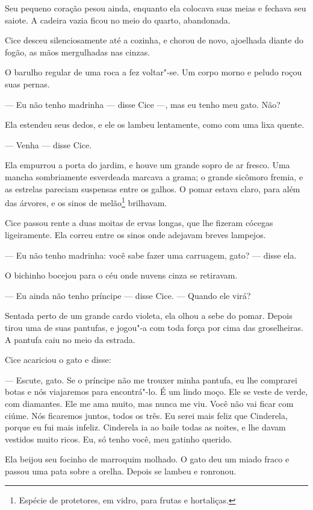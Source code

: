 Seu pequeno coração pesou ainda, enquanto ela colocava suas meias e
fechava seu saiote. A cadeira vazia ficou no meio do quarto, abandonada.

Cice desceu silenciosamente até a cozinha, e chorou de novo, ajoelhada
diante do fogão, as mãos mergulhadas nas cinzas.

O barulho regular de uma roca a fez voltar"-se. Um corpo morno e peludo
roçou suas pernas.

--- Eu não tenho madrinha --- disse Cice ---, mas eu tenho meu gato. Não?

Ela estendeu seus dedos, e ele os lambeu lentamente, como com uma lixa
quente.

--- Venha --- disse Cice.

Ela empurrou a porta do jardim, e houve um grande sopro de ar fresco.
Uma mancha sombriamente esverdeada marcava a grama; o grande sicômoro
fremia, e as estrelas pareciam suspensas entre os galhos. O pomar estava
claro, para além das árvores, e os sinos de melão\footnote{ Espécie de
protetores, em vidro, para frutas e hortaliças.} brilhavam.

Cice passou rente a duas moitas de ervas longas, que lhe fizeram
cócegas ligeiramente. Ela correu entre os sinos onde adejavam breves
lampejos.

--- Eu não tenho madrinha: você sabe fazer uma carruagem, gato? --- disse
ela.

O bichinho bocejou para o céu onde nuvens cinza se retiravam.

--- Eu ainda não tenho príncipe --- disse Cice. --- Quando ele virá?

Sentada perto de um grande cardo violeta, ela olhou a sebe do pomar.
Depois tirou uma de suas pantufas, e jogou"-a com toda força por cima das
groselheiras. A pantufa caiu no meio da estrada.

Cice acariciou o gato e disse:

--- Escute, gato. Se o príncipe não me trouxer minha pantufa, eu lhe
comprarei botas e nós viajaremos para encontrá"-lo. É um lindo moço. Ele se
veste de verde, com diamantes. Ele me ama muito, mas nunca me viu. Você
não vai ficar com ciúme. Nós ficaremos juntos, todos os três. Eu serei
mais feliz que Cinderela, porque eu fui mais infeliz. Cinderela ia ao
baile todas as noites, e lhe davam vestidos muito ricos. Eu, só tenho
você, meu gatinho querido.

Ela beijou seu focinho de marroquim molhado. O gato deu um miado fraco
e passou uma pata sobre a orelha. Depois se lambeu e ronronou.

